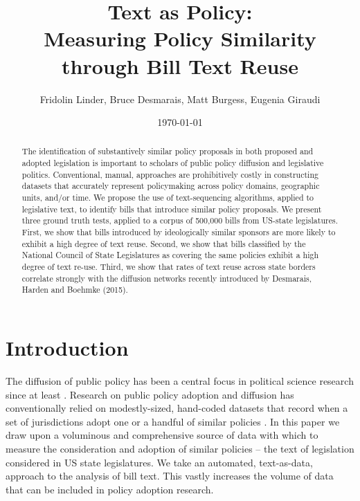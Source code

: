 \documentclass[12pt]{article} %
\begin{document}
 



\title{Text as Policy: \\ Measuring Policy Similarity through Bill Text Reuse}
\date{\today}
\author{Fridolin Linder, Bruce Desmarais, Matt Burgess, Eugenia Giraudi}

\maketitle



\singlespacing
\begin{abstract} 
    \noindent The identification of substantively similar policy proposals in both proposed and adopted legislation is important to scholars of public policy diffusion and legislative politics. Conventional, manual, approaches are prohibitively costly in constructing datasets that accurately represent policymaking across policy domains, geographic units, and/or time. We propose the use of text-sequencing algorithms, applied to legislative text, to identify bills that introduce similar policy proposals. We present three ground truth tests, applied to a corpus of 500,000 bills from US-state legislatures. First, we show that bills introduced by ideologically similar sponsors are more likely to exhibit a high degree of text reuse. Second, we show that bills classified by the National Council of State Legislatures as covering the same policies exhibit a high degree of text re-use. Third, we show that rates of text reuse across state borders correlate strongly with the diffusion networks recently introduced by Desmarais, Harden and Boehmke (2015).

\end{abstract}


\doublespacing
\clearpage

\section{Introduction} The diffusion of public policy has been a central focus in political science research since at least \citet{walker1969}. Research on public policy adoption and diffusion has conventionally relied on modestly-sized, hand-coded datasets that record when a set of jurisdictions adopt one or a handful of similar policies \citep{boehmke2012}. In this paper we draw upon a voluminous and comprehensive source of data with which to measure the consideration and adoption of similar policies -- the text of legislation considered in US state legislatures. We take an automated, text-as-data, approach to the analysis of bill text. This vastly increases the volume of data that can be included in policy adoption research. 
\end{document}
